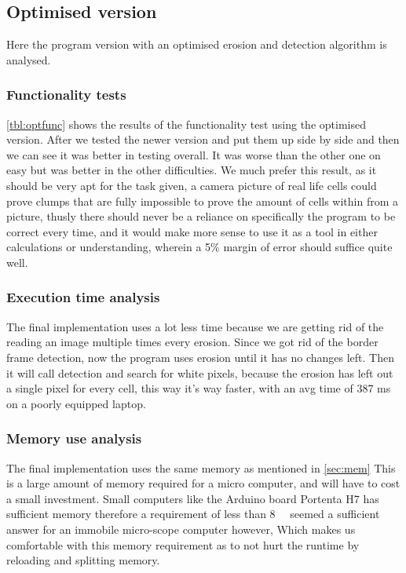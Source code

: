 \documentclass[a4paper, english]{article}
\numberwithin{equation}{section}
\begin{document}
\subsection{Optimised version}\label{sec:optimised}
Here the program version with an optimised erosion and detection algorithm is analysed.
\subsubsection{Functionality tests} \cref{tbl:optfunc} shows the results of the functionality test using the optimised version. After we tested the newer version and put them up side by side and then we can see it was better in testing overall. It was worse than the other one on easy but was better in the other difficulties. We much prefer this result, as it should be very apt for the task given, a camera picture of real life cells could prove clumps that are fully impossible to prove the amount of cells within from a picture, thusly there should never be a reliance on specifically the program to be correct every time, and it would make more sense to use it as a tool in either calculations or understanding, wherein a 5\% margin of error should suffice quite well.
\subsubsection{Execution time analysis}
The final implementation uses a lot less time because we are getting rid of the reading an image multiple times every erosion. Since we got rid of the border frame detection, now the program uses erosion until it has no changes left. Then it will call detection and search for white pixels, because the erosion has left out a single pixel for every cell, this way it's way faster, with an avg time of 387 ms on a poorly equipped laptop.
\subsubsection{Memory use analysis}
The final implementation uses the same memory as mentioned in \cref{sec:mem}\newline
This is a large amount of memory required for a micro computer, and will have to cost a small investment. Small computers like the Arduino board Portenta H7\cite{arduino} has sufficient memory therefore a requirement of less than \SI{8}{\mega\byte} seemed a sufficient answer for an immobile micro-scope computer however, Which makes us comfortable with this memory requirement as to not hurt the runtime by reloading and splitting memory.
\end{document}
